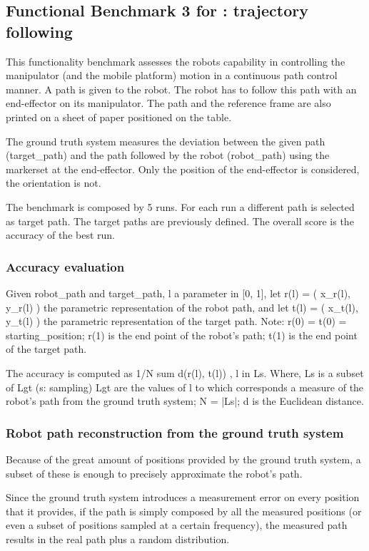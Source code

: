 \documentclass[a4paper]{article}
\begin{document}
\subsection{Functional Benchmark 3 for \ro@Work: trajectory following}
\label{sec:fbm3w}

This functionality benchmark assesses the robots capability in controlling the manipulator (and the mobile platform) motion in a continuous path control manner. A path is given to the robot. The robot has to follow this path with an end-effector on its manipulator. The path and the reference frame are also printed on a sheet of paper positioned on the table.

The ground truth system measures the deviation between the given path (target_path) and the path followed by the robot (robot_path) using the markerset at the end-effector.
Only the position of the end-effector is considered, the orientation is not.

The benchmark is composed by 5 runs. For each run a different path is selected as target path.
The target paths are previously defined.
The overall score is the accuracy of the best run.


\subsubsection{Accuracy evaluation}
Given robot_path and target_path, l a parameter in [0, 1],
let r(l) = ( x_r(l), y_r(l) ) the parametric representation of the robot path, and
let t(l) = ( x_t(l), y_t(l) ) the parametric representation of the target path.
Note: r(0) = t(0) = starting_position; r(1) is the end point of the robot's path; t(1) is the end point of the target path.

The accuracy is computed as 1/N sum{ d(r(l), t(l)) }, l in Ls.
Where,
 Ls is a subset of Lgt (s: sampling)
 Lgt are the values of l to which corresponds a measure of the robot's path from the ground truth system;
 N = |Ls|;
 d is the Euclidean distance.


\subsubsection{Robot path reconstruction from the ground truth system}
Because of the great amount of positions provided by the ground truth system, a subset of these is enough to precisely approximate the robot's path.

Since the ground truth system introduces a measurement error on every position that it provides, if the path is simply composed by all the measured positions (or even a subset of positions sampled at a certain frequency), the measured path results in the real path plus a random distribution.
\end{document}
